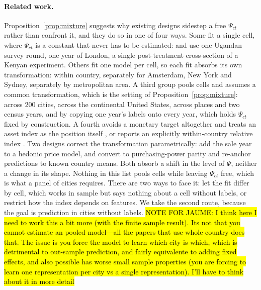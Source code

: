 \documentclass[11pt]{article}
\theoremstyle{remark}
\begin{document}
\paragraph{Related work.} Proposition~\ref{prop:mixture} suggests why existing designs sidestep a free
$\Psi_{ct}$ rather than confront it, and they do so in one of four ways. Some fit a single cell, where
$\Psi_{ct}$ is a constant that never has to be estimated: \citet{xie2016transfer} and
\citet{ayush2020generating} use one Ugandan survey round, \citet{suel2021multimodal} one year of
London, \citet{huang2021using} a single post-treatment cross-section of a Kenyan experiment. Others fit
one model per cell, so each fit absorbs its own transformation: \citet{jean2016combining} within
country, \citet{karasov2025predicting} separately for Amsterdam, New York and Sydney,
\citet{fan2023urban} separately by metropolitan area. A third group pools cells and assumes a common
transformation, which is the setting of Proposition~\ref{prop:mixture}: \citet{gebru2017using} across
200 cities, \citet{rolf2021generalizable} across the continental United States, \citet{khachiyan2022}
across places and two census years, and \citet{abbate2025longitudinal} by copying one year's labels
onto every year, which holds $\Psi_{ct}$ fixed by construction. A fourth avoids a monetary target
altogether and treats an asset index as the position itself \citep{yeh2020using, zheng2026satellite}, or reports
an explicitly within-country relative index \citep{chi2022micro}. Two designs correct the
transformation parametrically: \citet{law2019take} add the sale year to a hedonic price model, and \citet{sherman2026global} convert to purchasing-power parity and re-anchor predictions to known country
means. Both absorb a shift in the level of $\Psi$, neither a change in its shape. Nothing in this list
pools cells while leaving $\Psi_{ct}$ free, which is what a panel of cities requires. There are two
ways to face it: let the fit differ by cell, which works in sample but says nothing about a cell
without labels, or restrict how the index depends on features. We take the second route, because the
goal is prediction in cities without labels. \hl{NOTE FOR JAUME: I think here I need to work this a bit more (with the finite sample result). Its not that you cannot estimate an pooled model---all the papers that use whole country does that. The issue is you force the model to learn which city is which, which is detrimental to out-sample prediction, and fairly equivalente to adding fixed effects, and also possible has worse small sample properties (you are forcing to learn one representation per city vs a single representation). I'll have to think about it in more detail}
\end{document}
